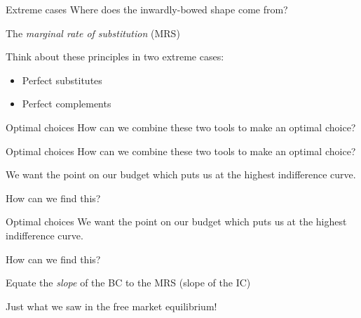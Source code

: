 \documentclass[aspectratio=169]{beamer}
\begin{document}
\begin{frame}{Extreme cases}
    Where does the inwardly-bowed shape come from?

    \vspace{2mm}

    The \textit{marginal rate of substitution} (MRS)

    \vspace{2mm}

    Think about these principles in two extreme cases:
    \begin{itemize}
        \item Perfect substitutes
        \item Perfect complements
    \end{itemize}
\end{frame}

\begin{frame}{Optimal choices}
    How can we combine these two tools to make an optimal choice?
\end{frame}

\begin{frame}{Optimal choices}
    How can we combine these two tools to make an optimal choice?

    \vspace{2mm}

    We want the point on our budget which puts us at the highest indifference curve.

    \vspace{2mm}

    How can we find this?

\end{frame}

\begin{frame}{Optimal choices}
    We want the point on our budget which puts us at the highest indifference curve.

    \vspace{2mm}

    How can we find this?

    \vspace{2mm}

    Equate the \textit{slope} of the BC to the MRS (slope of the IC)

    \vspace{2mm}

    Just what we saw in the free market equilibrium!

\end{frame}
\end{document}
